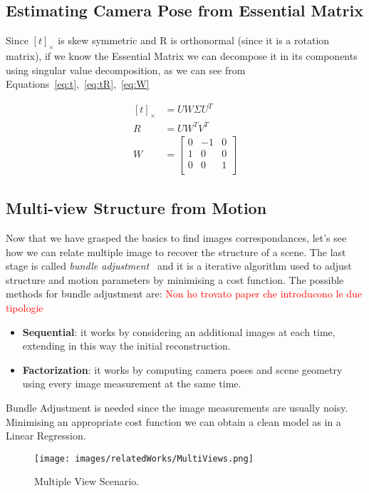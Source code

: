 \subsection{Estimating Camera Pose from Essential Matrix}
 Since  $ \left[ t\right]_{\times} $ is skew symmetric and R is orthonormal (since 
it is a rotation matrix), if we know the Essential Matrix we can decompose it
in its components using singular value decomposition, as we can see from Equations~\ref{eq:t},~\ref{eq:tR},~\ref{eq:W}

%
\begin{align}
    \left[ t\right]_{\times} &=  U W \Sigma U^T \label{eq:t}\\
    R &= U W^T V^T  \label{eq:tR}\\
    W&=
    \begin{bmatrix}
      0 & -1& 0 \\
      1 & 0 & 0 \\
      0 & 0 & 1     \\
    \end{bmatrix}\label{eq:W}
\end{align}


\subsection{Multi-view Structure from Motion}
Now that we have grasped the basics to find images correspondances, let's see how we can relate multiple image to recover the structure of a scene.
The last stage is called \textit{bundle adjustment}~\cite{bundle} and it is a iterative algorithm used to adjust structure and motion parameters by minimising a cost function.
The possible methods for bundle adjustment are: \textcolor{red}{Non ho trovato paper che introducono le due tipologie}
\begin{itemize}
    \item \textbf{Sequential}: it works by considering an additional images at each time, extending in this way the initial reconstruction.
    \item \textbf{Factorization}: it works by computing camera poses and scene geometry using every image measurement at the same time.
\end{itemize}

Bundle Adjustment is needed since the image measurements are usually noisy. Minimising an appropriate cost function we can obtain a clean model as in a Linear Regression.
\begin{figure}
    \centering
    \texttt{[image: images/relatedWorks/MultiViews.png]} %
    \caption{Multiple View Scenario. }
    \label{fig:multiview}
\end{figure}


